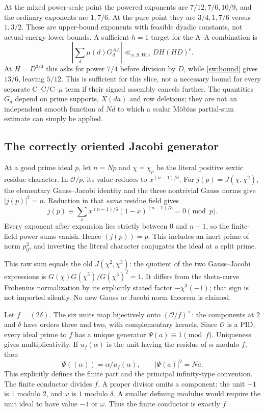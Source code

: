 At the mixed power-scale point the powered exponents are
$7/12,7/6,10/9$, and the ordinary exponents are $1,7/6$.
At the pure point they are $3/4,1,7/6$ versus $1,3/2$.
These are upper-bound exponents with feasible dyadic constants, not actual
energy lower bounds. A sufficient $h=1$ target for the A--A combination is
\begin{equation}\label{sw:target}
 \left|\sum_d\mu(d)G_d^{AA}\right|
       \ll_{\nu,S,W,\epsilon}DH(HD)^\epsilon.
\end{equation}
At $H=D^{3/4}$ this asks for power $7/4$ before division by $D$, while
\eqref{sw:bound} gives $13/6$, leaving $5/12$.
This is sufficient for this slice, not a necessary bound for every separate
C--C/C--$\mu$ term if their signed assembly cancels further.
The quantities $G_d$ depend on prime supports, $X(da)$ and row deletions;
they are not an independent smooth function of $Nd$ to which a scalar
M\"obius partial-sum estimate can simply be applied.

\subsection{The correctly oriented Jacobi generator}
At a good prime ideal $p$, let $n=Np$ and $\chi=\chi_p$ be the literal
positive sextic residue character. In $\mathcal O/p$, its value reduces
to $x^{(n-1)/6}$. For $j(p)=J(\chi,\chi^2)$, the elementary Gauss--Jacobi
identity and the three nontrivial Gauss norms give $|j(p)|^2=n$.
Reduction in that \emph{same} residue field gives
\[
 j(p)\equiv\sum_x x^{(n-1)/6}(1-x)^{(n-1)/3}=0\pmod p.
\]
Every exponent after expansion lies strictly between $0$ and $n-1$,
so the finite-field power sums vanish. Hence $(j(p))=p$.
This includes an inert prime of norm $p_0^2$, and inverting the literal
character conjugates the ideal at a split prime.

This raw sum equals the old $J(\chi^2,\chi^3)$: the quotient of the two
Gauss--Jacobi expressions is
$G(\chi)G(\chi^5)/G(\chi^3)^2=1$.
It differs from the theta-curve Frobenius normalization by its explicitly
stated factor $-\chi^3(-1)$; that sign is not imported silently.
No new Gauss or Jacobi norm theorem is claimed.

Let $f=(2\delta)$. The six units map bijectively onto
$(\mathcal O/f)^\times$: the components at $2$ and $\delta$ have orders
three and two, with complementary kernels. Since $\mathcal O$ is a PID,
every ideal prime to $f$ has a unique generator $\Psi(a)\equiv1\pmod f$.
Uniqueness gives multiplicativity. If $u_f(\alpha)$ is the unit having
the residue of $\alpha$ modulo $f$, then
\[
 \Psi((\alpha))=\alpha/u_f(\alpha),\qquad
 |\Psi(a)|^2=Na.
\]
This explicitly defines the finite part and the principal infinity-type
convention. The finite conductor divides $f$. A proper divisor omits a
component: the unit $-1$ is $1$ modulo $2$, and $\omega$ is $1$ modulo
$\delta$. A smaller defining modulus would require the unit ideal to
have value $-1$ or $\omega$. Thus the finite conductor is exactly $f$.

